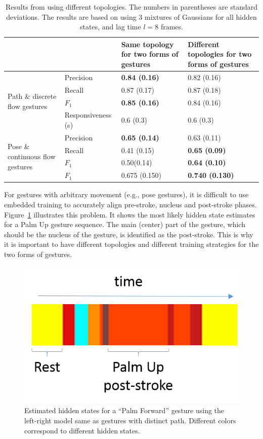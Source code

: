 \begin{table}[tbh]
\centering
\begin{tabular}{|l|l|p{3cm}|p{3cm}|}
\hline
& & \textbf{Same topology for two forms of gestures} & \textbf{Different
topologies for two forms of gestures} \\
\hline
\multirow{4}{4cm}{Path \& discrete flow gestures} 
& Precision & \textbf{0.84 (0.16)} & 0.82 (0.16) \\
\cline{2-4}
& Recall & 0.87 (0.17) & 0.87 (0.18)\\
\cline{2-4}
& $F_1$ & \textbf{0.85 (0.16)} &  0.84 (0.16)\\
\cline{2-4}
& Responsiveness (s) & 0.6 (0.3) & 0.6 (0.3) \\
\hline
\multirow{4}{4.5cm}{Pose \& continuous flow gestures}
& Precision & \textbf{0.65 (0.14)} & 0.63 (0.11) \\
\cline{2-4}
& Recall & 0.41 (0.15) & \textbf{0.65 (0.09)} \\
\cline{2-4}
& $F_1$ & 0.50(0.14) & \textbf{0.64 (0.10)} \\
\hline
\textbf{Average} & $F_1$ & 0.675 (0.150) & \textbf{0.740 (0.130)} \\
\hline
\end{tabular}
\caption{Results from using different topologies. The numbers in parentheses are
standard deviations. The results are based on using 3 mixtures of Gaussians
for all hidden states, and lag time
$l = 8$ frames.}
\label{tab:result}
\end{table}

For gestures with arbitrary movement (e.g., pose gestures), it is difficult to
use embedded training to accurately align pre-stroke, nucleus and post-stroke phases.
Figure~\ref{fig:palm-hidden} illustrates this problem. It shows the most
likely hidden state estimates for a Palm Up gesture sequence. The main (center)
part of the gesture, which should be the nucleus of the gesture, is identified
as the post-stroke. This is why it is important to have different topologies and
different training strategies for the two forms of gestures.

\begin{figure}[tbh]
\centering
\includegraphics[width=0.3\linewidth]{figures/palm_hidden_label.png}
\caption{Estimated hidden states for a ``Palm Forward'' gesture using the
left-right model same as gestures with distinct path. Different colors correspond to
different hidden states.}
\label{fig:palm-hidden}
\end{figure}

